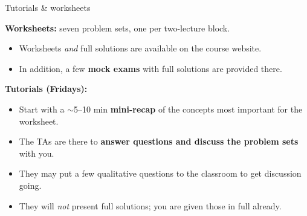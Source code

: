 \documentclass[aspectratio=169, 11pt]{beamer}
\begin{document}
\begin{frame}{Tutorials \& worksheets}
  \textbf{Worksheets:} seven problem sets, one per two-lecture block.
  \begin{itemize}
    \item Worksheets \emph{and} full solutions are available on the course website.
    \item In addition, a few \textbf{mock exams} with full solutions are provided there.
  \end{itemize}
  \vskip4pt\relax
  \textbf{Tutorials (Fridays):}
  \begin{itemize}
    \item Start with a $\sim$5--10 min \textbf{mini-recap} of the concepts most important for the worksheet.
    \item The TAs are there to \textbf{answer questions and discuss the problem sets} with you.
    \item They may put a few qualitative questions to the classroom to get discussion going.
    \item They will \emph{not} present full solutions; you are given those in full already.
  \end{itemize}
  \vskip2pt\relax
\end{frame}
\end{document}
